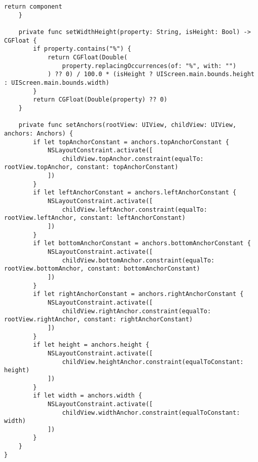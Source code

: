 \begin{lstlisting}[caption={Функция определения списка событий, по свершению которых происходит перезагрузка}]
        return component
    }

    private func setWidthHeight(property: String, isHeight: Bool) -> CGFloat {
        if property.contains("%") {
            return CGFloat(Double(
                property.replacingOccurrences(of: "%", with: "")
            ) ?? 0) / 100.0 * (isHeight ? UIScreen.main.bounds.height : UIScreen.main.bounds.width)
        }
        return CGFloat(Double(property) ?? 0)
    }

    private func setAnchors(rootView: UIView, childView: UIView, anchors: Anchors) {
        if let topAnchorConstant = anchors.topAnchorConstant {
            NSLayoutConstraint.activate([
                childView.topAnchor.constraint(equalTo: rootView.topAnchor, constant: topAnchorConstant)
            ])
        }
        if let leftAnchorConstant = anchors.leftAnchorConstant {
            NSLayoutConstraint.activate([
                childView.leftAnchor.constraint(equalTo: rootView.leftAnchor, constant: leftAnchorConstant)
            ])
        }
        if let bottomAnchorConstant = anchors.bottomAnchorConstant {
            NSLayoutConstraint.activate([
                childView.bottomAnchor.constraint(equalTo: rootView.bottomAnchor, constant: bottomAnchorConstant)
            ])
        }
        if let rightAnchorConstant = anchors.rightAnchorConstant {
            NSLayoutConstraint.activate([
                childView.rightAnchor.constraint(equalTo: rootView.rightAnchor, constant: rightAnchorConstant)
            ])
        }
        if let height = anchors.height {
            NSLayoutConstraint.activate([
                childView.heightAnchor.constraint(equalToConstant: height)
            ])
        }
        if let width = anchors.width {
            NSLayoutConstraint.activate([
                childView.widthAnchor.constraint(equalToConstant: width)
            ])
        }
    }
}
\end{lstlisting}

\pagebreak